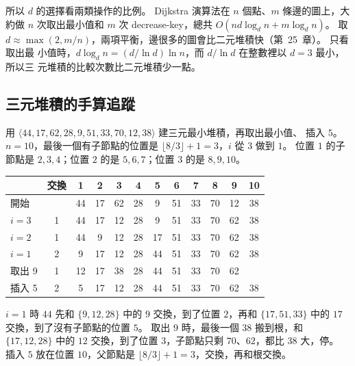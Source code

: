 所以 $d$ 的選擇看兩類操作的比例。 Dijkstra 演算法在 $n$ 個點、$m$ 條邊的圖上，大約做
$n$ 次取出最小值和 $m$ 次 decrease-key，總共 $O(n d \log_d n + m \log_d n)$。 取
$d \approx \max(2, m/n)$，兩項平衡，邊很多的圖會比二元堆積快（第~25~章）。 只看取出最
小值時，$d \log_d n = (d / \ln d) \ln n$，而 $d / \ln d$ 在整數裡以 $d = 3$ 最小，所以三
元堆積的比較次數比二元堆積少一點。

\subsection{三元堆積的手算追蹤}

用 $\langle 44, 17, 62, 28, 9, 51, 33, 70, 12, 38 \rangle$ 建三元最小堆積，再取出最小值、
插入 $5$。 $n = 10$，最後一個有子節點的位置是 $\lfloor 8/3 \rfloor + 1 = 3$，$i$ 從 $3$
做到 $1$。 位置 $1$ 的子節點是 $2, 3, 4$；位置 $2$ 的是 $5, 6, 7$；位置 $3$ 的是
$8, 9, 10$。

\begin{center}
\begin{tabular}{lc*{10}{c}}
\toprule
& 交換 & 1 & 2 & 3 & 4 & 5 & 6 & 7 & 8 & 9 & 10 \\
\midrule
開始 & & 44 & 17 & 62 & 28 & 9 & 51 & 33 & 70 & 12 & 38 \\
$i = 3$ & 1 & 44 & 17 & 12 & 28 & 9 & 51 & 33 & 70 & 62 & 38 \\
$i = 2$ & 1 & 44 & 9 & 12 & 28 & 17 & 51 & 33 & 70 & 62 & 38 \\
$i = 1$ & 2 & 9 & 17 & 12 & 28 & 44 & 51 & 33 & 70 & 62 & 38 \\
\midrule
取出 9 & 1 & 12 & 17 & 38 & 28 & 44 & 51 & 33 & 70 & 62 \\
插入 5 & 2 & 5 & 17 & 12 & 28 & 44 & 51 & 33 & 70 & 62 & 38 \\
\bottomrule
\end{tabular}
\end{center}

$i = 1$ 時 $44$ 先和 $\{9, 12, 28\}$ 中的 $9$ 交換，到了位置 $2$，再和 $\{17, 51, 33\}$
中的 $17$ 交換，到了沒有子節點的位置 $5$。 取出 $9$ 時，最後一個 $38$ 搬到根，和
$\{17, 12, 28\}$ 中的 $12$ 交換，到了位置 $3$，子節點只剩 $70$、$62$，都比 $38$ 大，停。
插入 $5$ 放在位置 $10$，父節點是 $\lfloor 8/3 \rfloor + 1 = 3$，交換，再和根交換。

\begin{center}
\label{fig:hp-ternary}
\end{center}

